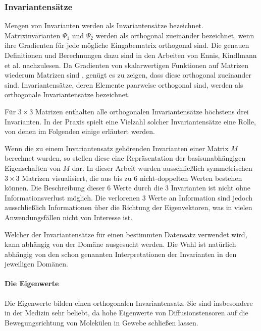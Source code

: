 \documentclass[a4paper,fontsize=12pt,toc=bib,parskip=half,ngerman]{scrartcl}
\begin{document}
\subsubsection{Invariantens\"atze} 
\label{sec:Invariants}
Mengen von Invarianten werden als Invariantens\"atze bezeichnet.
Matrixinvarianten $\Psi_1$ und $\Psi_2$ werden als orthogonal zueinander bezeichnet, wenn ihre Gradienten f\"ur jede m\"ogliche Eingabematrix orthogonal sind. Die genauen Definitionen und Berechnungen dazu sind in den Arbeiten von Ennis, Kindlmann et al. \cite{ennis2006orthogonal} nachzulesen. Da Gradienten von skalarwertigen Funktionen auf Matrizen wiederum Matrizen sind \cite[S.~137]{ennis2006orthogonal}, gen\"ugt es zu zeigen, dass diese orthogonal zueinander sind. Invariantens\"atze, deren Elemente paarweise orthogonal sind, werden als orthogonale Invariantens\"atze bezeichnet.

F\"ur $3\times 3$ Matrizen enthalten alle orthogonalen Invariantens\"atze h\"ochstens drei Invarianten. In der Praxis spielt eine Vielzahl solcher Invariantens\"atze eine Rolle, von denen im Folgenden einige erl\"autert werden.

Wenn die zu einem Invariantensatz geh\"orenden Invarianten einer Matrix $M$ berechnet wurden, so stellen diese eine Repr\"asentation der basisunabh\"angigen Eigenschaften von $M$ dar. In dieser Arbeit wurden ausschlie{\ss}lich symmetrischen $3\times3$ Matrizen visualisiert, die aus bis zu 6 nicht-doppelten Werten bestehen k\"onnen. Die Beschreibung dieser 6 Werte durch die 3 Invarianten ist nicht ohne Informationsverlust m\"oglich. Die verlorenen 3 Werte an Information sind jedoch ausschlie{\ss}lich Informationen \"uber die Richtung der Eigenvektoren, was in vielen Anwendungsf\"allen nicht von Interesse ist.

Welcher der Invariantens\"atze f\"ur einen bestimmten Datensatz verwendet wird, kann abh\"angig von der Dom\"ane ausgesucht werden. Die Wahl ist nat\"urlich abh\"angig von den schon genannten Interpretationen der Invarianten in den jeweiligen Dom\"anen.

\paragraph{Die Eigenwerte}

Die Eigenwerte bilden einen orthogonalen Invariantensatz. Sie sind insbesondere in der Medizin sehr beliebt, da hohe Eigenwerte von Diffusionstensoren auf die Bewegungsrichtung von Molek\"ulen in Gewebe schlie{\ss}en lassen.
\end{document}
